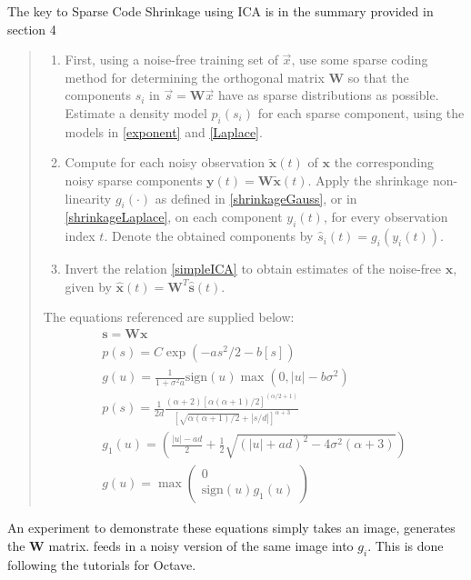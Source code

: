 \documentclass[12pt]{report}
\begin{document}
The key to Sparse Code Shrinkage using ICA is in the summary provided in section 4 \cite[4]{hyvarinen99sparse}
\begin{quote}
\begin{enumerate}
\item First, using a noise-free training set of $\vec{x}$, use some sparse coding method for determining the orthogonal matrix $\mathbf{W}$ so that the components $s_i$ in $\vec{s} = \mathbf{W}\vec{x}$ have as sparse distributions as possible.  Estimate a density model $p_i (s_i)$ for each sparse component, using the models in \ref{exponent} and \ref{Laplace}.
\item Compute for each noisy observation $\mathbf{\tilde{x}}(t)$ of $\mathbf{x}$ the corresponding noisy sparse components $\mathbf{y}(t) = \mathbf{W}\mathbf{\tilde{x}}(t) $.  Apply the shrinkage non-linearity $g_i( \cdot)$ as defined in \ref{shrinkageGauss}, or in \ref{shrinkageLaplace}, on each component $y_i(t)$, for every observation index $t$.  Denote the obtained components by $\hat{s}_i (t) = g_i (y_i (t))$.
\item Invert the relation \ref{simpleICA} to obtain estimates of the noise-free $\mathbf{x}$, given by $\mathbf{\hat{x}}(t) = \mathbf{W}^T \hat{\mathbf{s}}(t)$.
\end{enumerate}

The equations referenced are supplied below:
\begin{eqnarray}
\mathbf{s} = \mathbf{W}\mathbf{x} \label{simpleICA} \\
p(s) = C \exp ( -a s^2 / 2 - b[s])  \label{exponent} \\
g( u) = \frac{1}{1 + \sigma^2 a }\textrm{sign} (u) \max (0, |u| - b\sigma^2) \label{shrinkageGauss} \\
p(s) = \frac{1}{2d} \frac{(\alpha +2) [ \alpha (\alpha + 1) / 2]^{(\alpha / 2 + 1)}} { [\sqrt{\alpha (\alpha +1) /2} + | s/d| ]^{\alpha + 3}} \label{Laplace} \\
g_1(u) = (\frac{|u| - ad} {2} + \frac{1}{2}\sqrt{ (|u| + ad)^2 - 4 \sigma ^2 ( \alpha + 3) } )\\
g(u) = \max 
\left(
\begin{array}{l}
0  \\
 \textrm{sign} (u) g_1(u)
\end{array}
\right)
\label{shrinkageLaplace}
\end{eqnarray}


\end{quote}


An experiment to demonstrate these equations simply takes an image, generates the $\mathbf{W}$ matrix. feeds in a noisy version of the same image into $g_i$.   This is done following the tutorials for Octave.    
\end{document}

